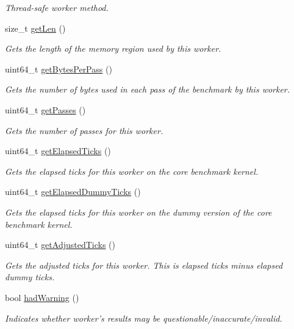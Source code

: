 \begin{DoxyCompactItemize}
\begin{DoxyCompactList}\small\item\em Thread-\/safe worker method. \end{DoxyCompactList}\item 
size\-\_\-t \hyperlink{classxmem_1_1benchmark_1_1_throughput_benchmark_worker_a65dfa53d591ebf85ee3d1dfdd7c98f20}{get\-Len} ()
\begin{DoxyCompactList}\small\item\em Gets the length of the memory region used by this worker. \end{DoxyCompactList}\item 
uint64\-\_\-t \hyperlink{classxmem_1_1benchmark_1_1_throughput_benchmark_worker_aa3c3f95c0dd92e82391135cc57e1ab1f}{get\-Bytes\-Per\-Pass} ()
\begin{DoxyCompactList}\small\item\em Gets the number of bytes used in each pass of the benchmark by this worker. \end{DoxyCompactList}\item 
uint64\-\_\-t \hyperlink{classxmem_1_1benchmark_1_1_throughput_benchmark_worker_afc7a394e6a04e4fe72d82db3ca47cd62}{get\-Passes} ()
\begin{DoxyCompactList}\small\item\em Gets the number of passes for this worker. \end{DoxyCompactList}\item 
uint64\-\_\-t \hyperlink{classxmem_1_1benchmark_1_1_throughput_benchmark_worker_acf9ec8195f85292cc744b89b3ab0e6cc}{get\-Elapsed\-Ticks} ()
\begin{DoxyCompactList}\small\item\em Gets the elapsed ticks for this worker on the core benchmark kernel. \end{DoxyCompactList}\item 
uint64\-\_\-t \hyperlink{classxmem_1_1benchmark_1_1_throughput_benchmark_worker_a301d7c1f0f7400a9f4a8a4be66969319}{get\-Elapsed\-Dummy\-Ticks} ()
\begin{DoxyCompactList}\small\item\em Gets the elapsed ticks for this worker on the dummy version of the core benchmark kernel. \end{DoxyCompactList}\item 
uint64\-\_\-t \hyperlink{classxmem_1_1benchmark_1_1_throughput_benchmark_worker_aac1a7f68313e877f4f73d212d00d5289}{get\-Adjusted\-Ticks} ()
\begin{DoxyCompactList}\small\item\em Gets the adjusted ticks for this worker. This is elapsed ticks minus elapsed dummy ticks. \end{DoxyCompactList}\item 
bool \hyperlink{classxmem_1_1benchmark_1_1_throughput_benchmark_worker_af44781eee1ae525ce94ec83da6e7595e}{had\-Warning} ()
\begin{DoxyCompactList}\small\item\em Indicates whether worker's results may be questionable/inaccurate/invalid. \end{DoxyCompactList}\end{DoxyCompactItemize}
